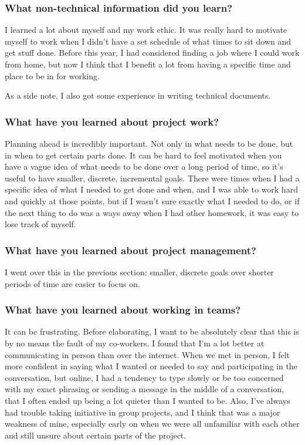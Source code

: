 \documentclass[10pt,journal,compsoc, draftclsnofoot,onecolumn]{IEEEtran}
\begin{document}
\subsubsection{What non-technical information did you learn?}
I learned a lot about myself and my work ethic. 
It was really hard to motivate myself to work when I didn't have a set schedule of what times to sit down and get stuff done. 
Before this year, I had considered finding a job where I could work from home, but now I think that I benefit a lot from having a specific time and place to be in for working.

As a side note, I also got some experience in writing technical documents.

\subsubsection{What have you learned about project work?}
Planning ahead is incredibly important. 
Not only in what needs to be done, but in when to get certain parts done. 
It can be hard to feel motivated when you have a vague idea of what needs to be done over a long period of time, so it's useful to have smaller, discrete, incremental goals. 
There were times when I had a specific idea of what I needed to get done and when, and I was able to work hard and quickly at those points, but if I wasn't sure exactly what I needed to do, or if the next thing to do was a ways away when I had other homework, it was easy to lose track of myself.


\subsubsection{What have you learned about project management?}
I went over this in the previous section: smaller, discrete goals over shorter periods of time are easier to focus on.


\subsubsection{What have you learned about working in teams?}
It can be frustrating.
Before elaborating, I want to be absolutely clear that this is by no means the fault of my co-workers.
I found that I'm a lot better at communicating in person than over the internet.
When we met in person, I felt more confident in saying what I wanted or needed to say and participating in the conversation, but online, I had a tendency to type slowly or be too concerned with my exact phrasing or sending a message in the middle of a conversation, that I often ended up being a lot quieter than I wanted to be.
Also, I've always had trouble taking initiative in group projects, and I think that was a major weakness of mine, especially early on when we were all unfamiliar with each other and still unsure about certain parts of the project.
\end{document}
